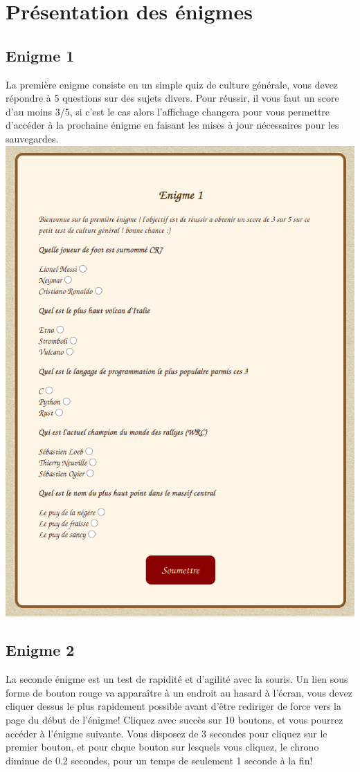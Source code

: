 \documentclass[12pt,a4paper]{article}
\begin{document}
\section{Présentation des énigmes}
\subsection{Enigme 1}
La première enigme consiste en un simple quiz de culture générale, vous devez répondre à 5 questions sur des sujets divers. Pour réussir, il vous faut un score d'au moins 3/5, si c'est le cas alors l'affichage changera pour vous permettre d'accéder à la prochaine énigme en faisant les mises à jour nécessaires pour les sauvegardes. \\

\includegraphics[scale=0.4]{enigme1.png}

\newpage
\subsection{Enigme 2}
La seconde énigme est un test de rapidité et d'agilité avec la souris. Un lien sous forme de bouton rouge va apparaître à un endroit au hasard à l'écran, vous devez cliquer dessus le plus rapidement possible avant d'être rediriger de force vers la page du début de l'énigme! Cliquez avec succès sur 10 boutons, et vous pourrez accéder à l'énigme suivante. Vous disposez de 3 secondes pour cliquez sur le premier bouton, et pour chque bouton sur lesquels vous cliquez, le chrono diminue de 0.2 secondes, pour un temps de seulement 1 seconde à la fin! \\
\end{document}
